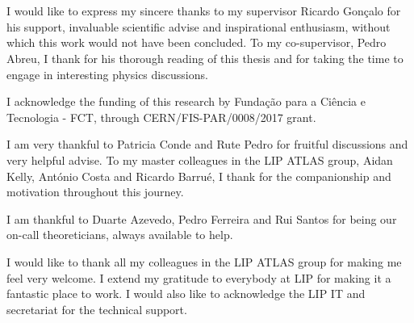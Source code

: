
\section*{\acknowledgments}



I would like to express my sincere thanks to my supervisor Ricardo Gon\c calo for his support, invaluable scientific advise and inspirational enthusiasm, without which this work would not have been concluded. To my co-supervisor, Pedro Abreu, I thank for his thorough reading of this thesis and for taking the time to engage in interesting physics discussions. 

I acknowledge the funding of this research by Funda\c c\~ao para a Ci\^encia e Tecnologia - FCT, through CERN/FIS-PAR/0008/2017 grant.

I am very thankful to Patricia Conde and Rute Pedro for fruitful discussions and very helpful advise. To my master colleagues in the LIP ATLAS group, Aidan Kelly, Ant\'onio Costa and Ricardo Barru\'e, I thank for the companionship and motivation throughout this journey. 

I am thankful to Duarte Azevedo, Pedro Ferreira and Rui Santos for being our on-call theoreticians, always available to help.   

I would like to thank all my colleagues in the LIP ATLAS group for making me feel very welcome. I extend my gratitude to everybody at LIP for making it a fantastic place to work. I would also like to acknowledge the LIP IT and secretariat for the technical support.

